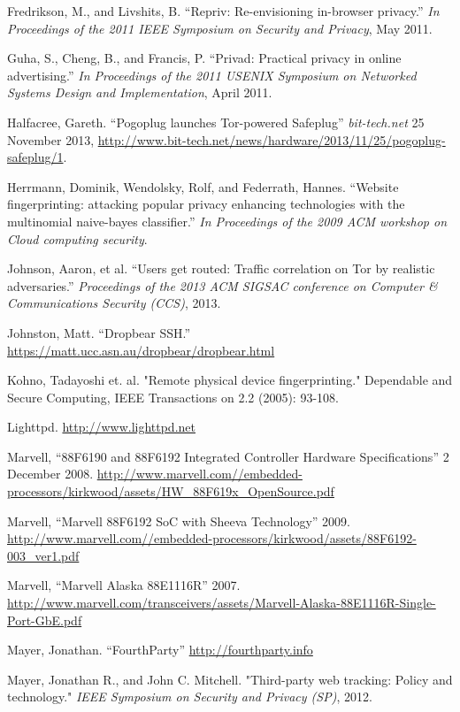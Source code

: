 \documentclass[conference]{IEEEtran}
\begin{document}
\begin{thebibliography}{1}
 Fredrikson, M., and Livshits, B. ``Repriv: Re-envisioning in-browser privacy.'' \emph{In Proceedings of the 2011 IEEE Symposium on Security and Privacy}, May 2011.

 Guha, S., Cheng, B., and Francis, P. ``Privad: Practical privacy in online advertising.'' \emph{In Proceedings of the 2011 USENIX Symposium on Networked Systems Design and Implementation}, April 2011.

 Halfacree, Gareth. ``Pogoplug launches Tor-powered Safeplug'' \emph{bit-tech.net} 25 November 2013, \url{http://www.bit-tech.net/news/hardware/2013/11/25/pogoplug-safeplug/1}.

 Herrmann, Dominik, Wendolsky, Rolf, and Federrath, Hannes.  ``Website fingerprinting: attacking popular privacy enhancing technologies with the multinomial naive-bayes classifier.'' \emph{In Proceedings of the 2009 ACM workshop on Cloud computing security}.

 Johnson, Aaron, et al. ``Users get routed: Traffic correlation on Tor by realistic adversaries.'' \emph{Proceedings of the 2013 ACM SIGSAC conference on Computer \& Communications Security (CCS)}, 2013.

 Johnston, Matt. ``Dropbear SSH.'' \url{https://matt.ucc.asn.au/dropbear/dropbear.html}

 Kohno, Tadayoshi et. al. "Remote physical device fingerprinting." Dependable and Secure Computing, IEEE Transactions on 2.2 (2005): 93-108.

 Lighttpd. \url{http://www.lighttpd.net}


 Marvell, ``88F6190 and 88F6192 Integrated Controller Hardware Specifications'' 2 December 2008. \url{http://www.marvell.com//embedded-processors/kirkwood/assets/HW_88F619x_OpenSource.pdf}

 Marvell, ``Marvell 88F6192 SoC with Sheeva Technology'' 2009. \url{http://www.marvell.com//embedded-processors/kirkwood/assets/88F6192-003_ver1.pdf}

 Marvell, ``Marvell Alaska 88E1116R'' 2007. \url{http://www.marvell.com/transceivers/assets/Marvell-Alaska-88E1116R-Single-Port-GbE.pdf}

 Mayer, Jonathan. ``FourthParty'' \url{http://fourthparty.info}

 Mayer, Jonathan R., and John C. Mitchell. "Third-party web tracking: Policy and technology." \emph{IEEE Symposium on Security and Privacy (SP)}, 2012.


\end{thebibliography}
\end{document}
